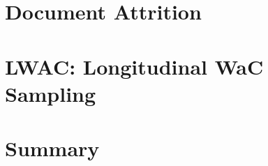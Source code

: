 
\label{sec:longitudinal:introduction}



\section{Document Attrition}
\label{sec:longitudinal:attrition}




\section{LWAC: Longitudinal WaC Sampling}
\label{sec:longitudinal:lwac}





\section{Summary}
\label{sec:longitudinal:summary}



